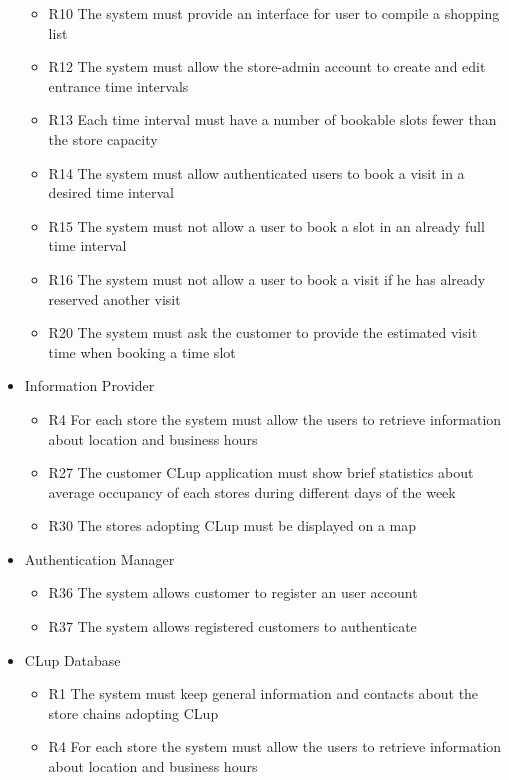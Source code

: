 \begin{itemize}
    \begin{itemize}
        \item R10 The system must provide an interface for user to compile a shopping list
        \item R12 The system must allow the store-admin account to create and edit entrance time intervals
        \item R13 Each time interval must have a number of bookable slots fewer than the store capacity
        \item R14 The system must allow authenticated users to book a visit in a desired time interval
        \item R15 The system must not allow a user to book a slot in an already full time interval
        \item R16 The system must not allow a user to book a visit if he has already reserved another visit
        \item R20 The system must ask the customer to provide the estimated visit time when booking a time slot
    \end{itemize}
    \item Information Provider
    \begin{itemize}
        \item R4 For each store the system must allow the users to retrieve information about location and business hours
        \item R27 The customer CLup application must show brief statistics about average occupancy of each stores during different days of the week
        \item R30 The stores adopting CLup must be displayed on a map
    \end{itemize}
    \item Authentication Manager
    \begin{itemize}
        \item R36 The system allows customer to register an user account
        \item R37 The system allows registered customers to authenticate
    \end{itemize}
    \item CLup Database
    \begin{itemize}
        \item R1 The system must keep general information and contacts about the store chains adopting CLup
        \item R4 For each store the system must allow the users to retrieve information about location and business hours

\end{itemize}
\end{itemize}

